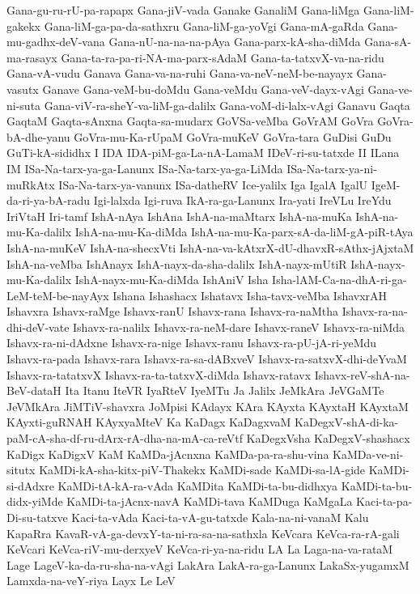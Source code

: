 {Gana-gu-ru-rU-pa-rapapx
Gana-jiV-vada
Ganake
GanaliM
Gana-liMga
Gana-liM-gakekx
Gana-liM-ga-pa-da-sathxru
Gana-liM-ga-yoVgi
Gana-mA-gaRda
Gana-mu-gadhx-deV-vana
Gana-nU-na-na-na-pAya
Gana-parx-kA-sha-diMda
Gana-sA-ma-rasayx
Gana-ta-ra-pa-ri-NA-ma-parx-sAdaM
Gana-ta-tatxvX-va-na-ridu
Gana-vA-vudu
Ganava
Gana-va-na-ruhi
Gana-va-neV-neM-be-nayayx
Gana-vasutx
Ganave
Gana-veM-bu-doMdu
Gana-veMdu
Gana-veV-dayx-vAgi
Gana-ve-ni-suta
Gana-viV-ra-sheY-va-liM-ga-dalilx
Gana-voM-di-lalx-vAgi
Ganavu
Gaqta
GaqtaM
Gaqta-sAnxna
Gaqta-sa-mudarx
GoVSa-veMba
GoVrAM
GoVra
GoVra-bA-dhe-yanu
GoVra-mu-Ka-rUpaM
GoVra-muKeV
GoVra-tara
GuDisi
GuDu
GuTi-kA-sididhx
I
IDA
IDA-piM-ga-La-nA-LamaM
IDeV-ri-su-tatxde
II
ILana
IM
ISa-Na-tarx-ya-ga-Lanunx
ISa-Na-tarx-ya-ga-LiMda
ISa-Na-tarx-ya-ni-muRkAtx
ISa-Na-tarx-ya-vanunx
ISa-datheRV
Ice-yalilx
Iga
IgalA
IgalU
IgeM-da-ri-ya-bA-radu
Igi-lalxda
Igi-ruva
IkA-ra-ga-Lanunx
Ira-yati
IreVLu
IreYdu
IriVtaH
Iri-tamf
IshA-nAya
IshAna
IshA-na-maMtarx
IshA-na-muKa
IshA-na-mu-Ka-dalilx
IshA-na-mu-Ka-diMda
IshA-na-mu-Ka-parx-sA-da-liM-gA-piR-tAya
IshA-na-muKeV
IshA-na-shecxVti
IshA-na-va-kAtxrX-dU-dhavxR-sAthx-jAjxtaM
IshA-na-veMba
IshAnayx
IshA-nayx-da-sha-dalilx
IshA-nayx-mUtiR
IshA-nayx-mu-Ka-dalilx
IshA-nayx-mu-Ka-diMda
IshAniV
Isha
Isha-lAM-Ca-na-dhA-ri-ga-LeM-teM-be-nayAyx
Ishana
Ishashacx
Ishatavx
Isha-tavx-veMba
IshavxrAH
Ishavxra
Ishavx-raMge
Ishavx-ranU
Ishavx-rana
Ishavx-ra-naMtha
Ishavx-ra-na-dhi-deV-vate
Ishavx-ra-nalilx
Ishavx-ra-neM-dare
Ishavx-raneV
Ishavx-ra-niMda
Ishavx-ra-ni-dAdxne
Ishavx-ra-nige
Ishavx-ranu
Ishavx-ra-pU-jA-ri-yeMdu
Ishavx-ra-pada
Ishavx-rara
Ishavx-ra-sa-dABxveV
Ishavx-ra-satxvX-dhi-deYvaM
Ishavx-ra-tatatxvX
Ishavx-ra-ta-tatxvX-diMda
Ishavx-ratavx
Ishavx-reV-shA-na-BeV-dataH
Ita
Itanu
IteVR
IyaRteV
IyeMTu
Ja
Jalilx
JeMkAra
JeVGaMTe
JeVMkAra
JiMTiV-shavxra
JoMpisi
KAdayx
KAra
KAyxta
KAyxtaH
KAyxtaM
KAyxti-guRNAH
KAyxyaMteV
Ka
KaDagx
KaDagxvaM
KaDegxV-shA-di-ka-paM-cA-sha-df-ru-dArx-rA-dha-na-mA-ca-reVtf
KaDegxVsha
KaDegxV-shashacx
KaDigx
KaDigxV
KaM
KaMDa-jAcnxna
KaMDa-pa-ra-shu-vina
KaMDa-ve-ni-situtx
KaMDi-kA-sha-kitx-piV-Thakekx
KaMDi-sade
KaMDi-sa-lA-gide
KaMDi-si-dAdxre
KaMDi-tA-kA-ra-vAda
KaMDita
KaMDi-ta-bu-didhxya
KaMDi-ta-bu-didx-yiMde
KaMDi-ta-jAcnx-navA
KaMDi-tava
KaMDuga
KaMgaLa
Kaci-ta-pa-Di-su-tatxve
Kaci-ta-vAda
Kaci-ta-vA-gu-tatxde
Kala-na-ni-vanaM
Kalu
KapaRra
KavaR-vA-ga-devxY-ta-ni-ra-sa-na-sathxla
KeVcara
KeVca-ra-rA-gali
KeVcari
KeVca-riV-mu-derxyeV
KeVca-ri-ya-na-ridu
LA
La
Laga-na-va-rataM
Lage
LageV-ka-da-ru-sha-na-vAgi
LakAra
LakA-ra-ga-Lanunx
LakaSx-yugamxM
Lamxda-na-veY-riya
Layx
Le
LeV
}
